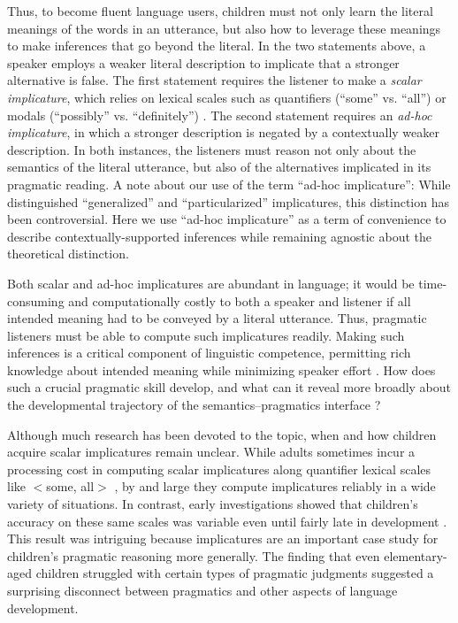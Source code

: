 \documentclass[man]{apa2}
\begin{document}
Thus, to become fluent language users, children must not only learn the literal meanings of the words in an utterance, but also how to leverage these meanings to make inferences that go beyond the literal. In the two statements above, a speaker employs a weaker literal description to implicate that a stronger alternative is false. The first statement requires the listener to make a \emph{scalar implicature}, which relies on lexical scales such as quantifiers (``some'' vs. ``all'') or modals (``possibly'' vs. ``definitely'') \cite{horn1972}. The second statement requires an \emph{ad-hoc implicature}, in which a stronger description is negated by a contextually weaker description. In both instances, the listeners must reason not only about the semantics of the literal utterance, but also of the alternatives implicated in its pragmatic reading. A note about our use of the term ``ad-hoc implicature'': While  distinguished ``generalized'' and ``particularized'' implicatures, this distinction has been controversial. Here we use ``ad-hoc implicature'' as a term of convenience to describe contextually-supported inferences while remaining agnostic about the theoretical distinction. 

Both scalar and ad-hoc implicatures are abundant in language; it would be time-consuming and computationally costly to both a speaker and listener if all intended meaning had to be conveyed by a literal utterance. Thus, pragmatic listeners must be able to compute such implicatures readily. Making such inferences is a critical component of linguistic competence, permitting rich knowledge about intended meaning while minimizing speaker effort \cite{grice1975,horn1984}. How does such a crucial pragmatic skill develop, and what can it reveal more broadly about the developmental trajectory of the semantics--pragmatics interface \cite{papafragou2003}?

Although much research has been devoted to the topic, when and how children acquire scalar implicatures remain unclear. While adults sometimes incur a processing cost in computing scalar implicatures along quantifier lexical scales like  $<${\sc some, all}$>$ \cite{bott2004,grodner2010,huang2009b}, by and large they compute implicatures reliably in a wide variety of situations. In contrast, early investigations showed that children's accuracy on these same scales was variable even until fairly late in development \cite{noveck2001}. This result was intriguing because implicatures are an important case study for children's pragmatic reasoning more generally. The finding that even elementary-aged children struggled with certain types of pragmatic judgments suggested a surprising disconnect between pragmatics and other aspects of language development.
\end{document}
